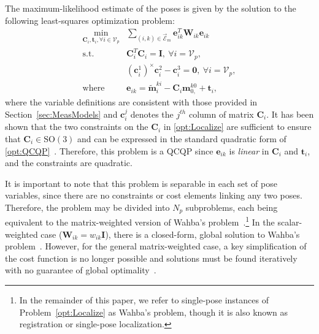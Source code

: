 \documentclass[lettersize,journal]{IEEEtran}
\newcommand{\EdgeSet}{\vec{\bm{\mathcal{E}}}}
\newcommand{\VertSetP}{\bm{\mathcal{V}}_p}
\begin{document}
The maximum-likelihood estimate of the poses is given by the solution to the following least-squares optimization problem:
\begin{equation}
	\label{opt:Localize}
	\begin{array}{rl}
		\min\limits_{\bm{C}_i,\bm{t}_i, \forall  i \in \VertSetP} &\sum\limits_{(i,k)\in\EdgeSet_m} \bm{e}_{ik}^T \bm{W}_{ik} \bm{e}_{ik} \\
		\mbox{s.t.} &  \bm{C}_i^T \bm{C}_i = \bm{I}, ~\forall i = \VertSetP,\\
		& (\bm{c}_i^{1})^\times\bm{c}_i^{2} - \bm{c}_i^{3} = \bm{0},~\forall i = \VertSetP, \\
		\mbox{where} & \bm{e}_{ik} = \tilde{\bm{m}}_i^{ki} - \bm{C}_i\bm{m}_{0,}^{k0} + \bm{t}_i ,
	\end{array}
\end{equation}
where the variable definitions are consistent with those provided in Section~\ref{sec:MeasModels} and $\bm{c}_i^j$ denotes the $j^{th}$ column of matrix $\bm{C}_i$. It has been shown that the two constraints on the $\bm{C}_i$ in \eqref{opt:Localize} are sufficient to ensure that $\bm{C}_i\in\mbox{SO}(3)$ and can be expressed in the standard quadratic form of \eqref{opt:QCQP}~\cite{tronInclusionDeterminantConstraints}. Therefore, this problem is a QCQP since $\bm{e}_{ik}$ is \emph{linear} in $\bm{C}_i$ and $\bm{t}_i$, and the constraints are quadratic. 

It is important to note that this problem is separable in each set of pose variables, since there are no constraints or cost elements linking any two poses. Therefore, the problem may be divided into $N_p$ subproblems, each being equivalent to the matrix-weighted version of Wahba's problem~\cite{chengTotalLeastSquaresEstimate2019, wahbaLeastSquaresEstimate1965}.\footnote{In the remainder of this paper, we refer to single-pose instances of Problem~\ref{opt:Localize} as Wahba's problem, though it is also known as registration or single-pose localization.} In the scalar-weighted case ($ \bm{W}_{ik} = w_{ik} \bm{I} $), there is a closed-form, global solution to Wahba's problem~\cite{hornClosedFormSolutionAbsolute1988}. However, for the general matrix-weighted case, a key simplification of the cost function is no longer possible and solutions must be found iteratively with no guarantee of global optimality~\cite{barfootPoseEstimationUsing2011,barfootStateEstimationRobotics2017, crassidisSurveyNonlinearAttitude2007}. 
\end{document}
